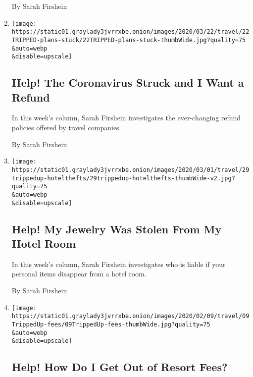 \begin{enumerate}
  By Sarah Firshein
\item
  \href{/2020/04/11/travel/coronavirus-travel-trip-refunds.html}{}

  \texttt{[image: https://static01.graylady3jvrrxbe.onion/images/2020/03/22/travel/22TRIPPED-plans-stuck/22TRIPPED-plans-stuck-thumbWide.jpg?quality=75\\\&auto=webp\\\&disable=upscale]}

  \hypertarget{help-the-coronavirus-struck-and-i-want-a-refund}{%
  \subsection{Help! The Coronavirus Struck and I Want a
  Refund}\label{help-the-coronavirus-struck-and-i-want-a-refund}}

  In this week's column, Sarah Firshein investigates the ever-changing
  refund policies offered by travel companies.

  By Sarah Firshein
\item
  \href{/2020/02/29/travel/travel-advice-jewelry-stolen-hotels.html}{}

  \texttt{[image: https://static01.graylady3jvrrxbe.onion/images/2020/03/01/travel/29trippedup-hotelthefts/29trippedup-hotelthefts-thumbWide-v2.jpg?quality=75\\\&auto=webp\\\&disable=upscale]}

  \hypertarget{help-my-jewelry-was-stolen-from-my-hotel-room}{%
  \subsection{Help! My Jewelry Was Stolen From My Hotel
  Room}\label{help-my-jewelry-was-stolen-from-my-hotel-room}}

  In this week's column, Sarah Firshein investigates who is liable if
  your personal items disappear from a hotel room.

  By Sarah Firshein
\item
  \href{/2020/02/08/travel/resort-fees.html}{}

  \texttt{[image: https://static01.graylady3jvrrxbe.onion/images/2020/02/09/travel/09TrippedUp-fees/09TrippedUp-fees-thumbWide.jpg?quality=75\\\&auto=webp\\\&disable=upscale]}

  \hypertarget{help-how-do-i-get-out-of-resort-fees}{%
  \subsection{Help! How Do I Get Out of Resort
  Fees?}\label{help-how-do-i-get-out-of-resort-fees}}


\end{enumerate}

